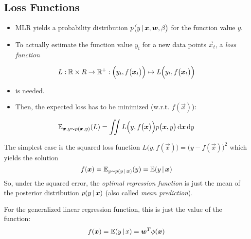 		\subsection{Loss Functions}
			\begin{itemize}
				\item MLR yields a probability distribution \( p\big(y \,\vert\, \bm{x}, \bm{w}, \beta\big) \) for the function value \(y\).
				\item To actually estimate the function value \(y_t\) for a new data points \(\vec{x}_t\), a \emph{loss function}
			\end{itemize}
			\begin{equation}
				L : \mathbb{R} \times R \to \mathbb{R}^+ : \Big(y_t, f\big(\bm{x}_t\big)\Big) \mapsto L\Big(y_t, f\big(\bm{x}_t\big)\Big)
			\end{equation}
			\begin{itemize}
				\item[] is needed.
				\item Then, the expected loss has to be minimized (w.r.t. \(f(\vec{x})\)):
			\end{itemize}
			\begin{equation}
				\mathbb{E}_{\bm{x}, y \sim p(\bm{x}, y)}(L) = \iint L\Big(y, f\big(\bm{x}\big)\Big) p\big(\bm{x}, y\big) \dd{\bm{x}} \dd{y}
			\end{equation}

			The simplest case is the squared loss function \( L\big(y, f(\vec{x})\big) = \big(y - f(\vec{x})\big)^2 \) which yields the solution
			\begin{equation}
				f(\bm{x}) = \mathbb{E}_{y \sim p(y \,\vert\, \bm{x})} (y) = \mathbb{E}(y \,\vert\, \bm{x})
			\end{equation}
			So, under the squared error, the \emph{optimal regression function} is just the mean of the posterior distribution \( p(y \,\vert\, \bm{x}) \) (also called \emph{mean prediction}).

			For the generalized linear regression function, this is just the value of the function:
			\begin{equation*}
				f(\bm{x}) = \mathbb{E}(y \,\vert\, x) = \bm{w}^T \phi(\bm{x})
			\end{equation*}

